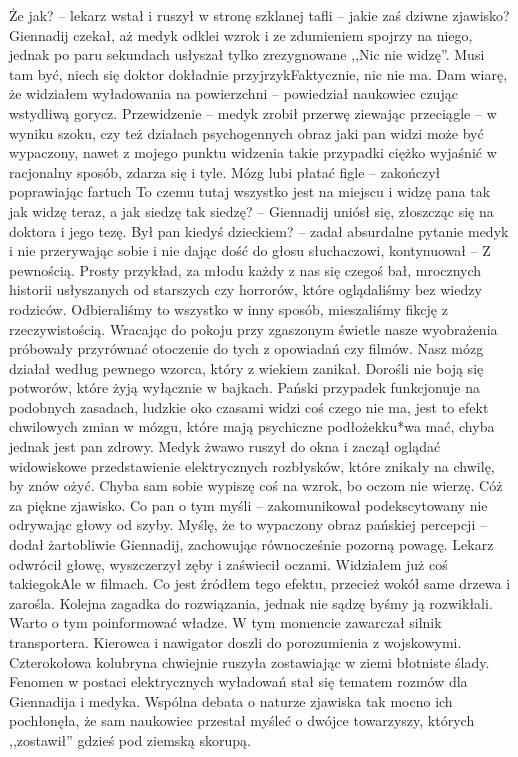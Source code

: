 \documentclass[../MAIN.tex]{subfiles}
\begin{document}
\xx Że jak? -- lekarz wstał i ruszył w stronę szklanej tafli -- jakie zaś dziwne zjawisko? 
\qd
Giennadij czekał, aż medyk odklei wzrok i ze zdumieniem spojrzy na niego, jednak po paru sekundach usłyszał tylko zrezygnowane ,,Nic nie widzę''. 
\sx Musi tam być, niech się doktor dokładnie przyjrzy\3kFaktycznie, nic nie ma. Dam wiarę, że widziałem wyładowania na powierzchni -- powiedział naukowiec czując wstydliwą gorycz. 
\xx Przewidzenie -- medyk zrobił przerwę ziewając przeciągle -- w wyniku szoku, czy też działach psychogennych obraz jaki pan widzi może być wypaczony, nawet z mojego punktu widzenia takie przypadki ciężko wyjaśnić w racjonalny sposób, zdarza się i tyle. Mózg lubi płatać figle -- zakończył poprawiając fartuch 
\xx To czemu tutaj wszystko jest na miejscu i widzę pana tak jak widzę teraz, a jak siedzę tak siedzę? -- Giennadij uniósł się, złoszcząc się na doktora i jego tezę. 
\xx Był pan kiedyś dzieckiem? -- zadał absurdalne pytanie medyk i nie przerywając sobie i nie dając dość do głosu słuchaczowi, kontynuował -- Z pewnością. Prosty przykład, za młodu każdy z nas się czegoś bał, mrocznych historii usłyszanych od starszych czy horrorów, które oglądaliśmy bez wiedzy rodziców. Odbieraliśmy to wszystko w inny sposób, mieszaliśmy fikcję z rzeczywistością. Wracając do pokoju przy zgaszonym świetle nasze wyobrażenia próbowały przyrównać otoczenie do tych z opowiadań czy filmów. Nasz mózg działał według pewnego wzorca, który z wiekiem zanikał. Dorośli nie boją się potworów, które żyją wyłącznie w bajkach. Pański przypadek funkcjonuje na podobnych zasadach, ludzkie oko czasami widzi coś czego nie ma, jest to efekt chwilowych zmian w mózgu, które mają psychiczne podłoże\3kku*wa mać, chyba jednak jest pan zdrowy.
\qd
Medyk żwawo ruszył do okna i zaczął oglądać widowiskowe przedstawienie elektrycznych rozbłysków, które znikały na chwilę, by znów ożyć. 
\sx Chyba sam sobie wypiszę coś na wzrok, bo oczom nie wierzę. Cóż za piękne zjawisko. Co pan o tym myśli -- zakomunikował podekscytowany nie odrywając głowy od szyby. 
\xx Myślę, że to wypaczony obraz pańskiej percepcji -- dodał żartobliwie Giennadij, zachowując równocześnie pozorną powagę.
\qd
Lekarz odwrócił głowę, wyszczerzył zęby i zaświecił oczami. 
\sx Widziałem już coś takiego\3kAle w filmach. Co jest źródłem tego efektu, przecież wokół same drzewa i zarośla. 
\xx Kolejna zagadka do rozwiązania, jednak nie sądzę byśmy ją rozwikłali. Warto o tym poinformować władze.
\qd
W tym momencie zawarczał silnik transportera. Kierowca i nawigator doszli do porozumienia z wojskowymi. Czterokołowa kolubryna chwiejnie ruszyła zostawiając w ziemi błotniste ślady. Fenomen w postaci elektrycznych wyładowań stał się tematem rozmów dla Giennadija i medyka. Wspólna debata o naturze zjawiska tak mocno ich pochłonęła, że sam naukowiec przestał myśleć o dwójce towarzyszy, których ,,zostawił'' gdzieś pod ziemską skorupą.
\end{document}
